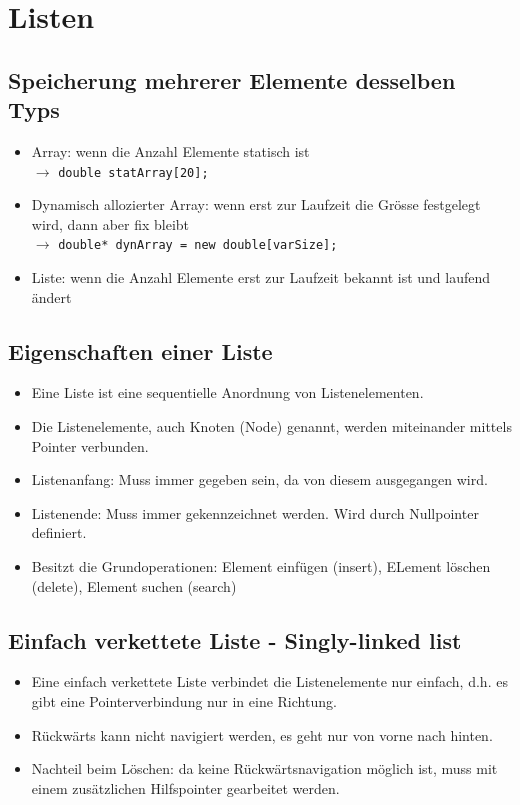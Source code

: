 \section{Listen}
\subsection{Speicherung mehrerer Elemente desselben Typs}
\begin{itemize}
  \item Array: wenn die Anzahl Elemente statisch ist \\ $\rightarrow$  \lstinline{double statArray[20];}
  \item Dynamisch allozierter Array: wenn erst zur Laufzeit die Grösse festgelegt wird, dann aber fix bleibt \\ $\rightarrow$
  \lstinline{double* dynArray = new double[varSize];}
  \item Liste: wenn die Anzahl Elemente erst zur Laufzeit bekannt ist und laufend ändert
\end{itemize}

\subsection{Eigenschaften einer Liste}
\begin{itemize}
  \item Eine Liste ist eine sequentielle Anordnung von Listenelementen.
  \item Die Listenelemente, auch Knoten (Node) genannt, werden miteinander mittels Pointer verbunden.
  \item Listenanfang: Muss immer gegeben sein, da von diesem ausgegangen wird.
  \item Listenende: Muss immer gekennzeichnet werden. Wird durch Nullpointer definiert.
  \item Besitzt die Grundoperationen: Element einfügen (insert), ELement löschen (delete), Element suchen (search)
\end{itemize}

\subsection{Einfach verkettete Liste - Singly-linked list}
\begin{itemize}
  \item Eine einfach verkettete Liste verbindet die Listenelemente nur einfach, d.h. es gibt eine Pointerverbindung nur in eine Richtung.
  \item Rückwärts kann nicht navigiert werden, es geht nur von vorne nach hinten.
  \item Nachteil beim Löschen: da keine Rückwärtsnavigation möglich ist, muss mit einem zusätzlichen Hilfspointer gearbeitet werden.
\end{itemize}

